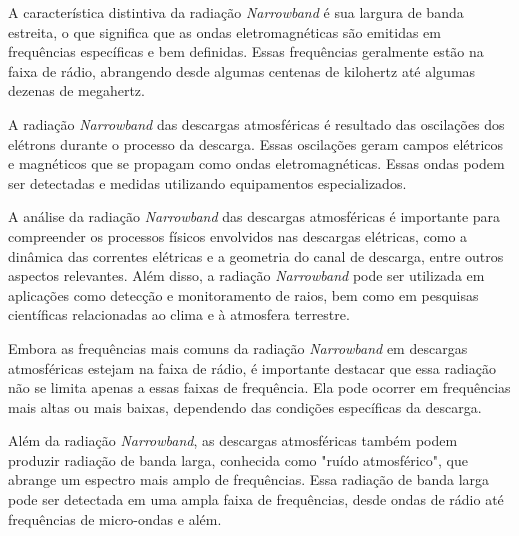 \documentclass[a4paper, 12pt, onecolumn,singlespacing]{article}
\begin{document}
		A característica distintiva da radiação \textit{Narrowband} é sua largura de banda estreita, o que significa que as ondas eletromagnéticas são emitidas em frequências específicas e bem definidas. Essas frequências geralmente estão na faixa de rádio, abrangendo desde algumas centenas de kilohertz até algumas dezenas de megahertz.
		
		A radiação \textit{Narrowband} das descargas atmosféricas é resultado das oscilações dos elétrons durante o processo da descarga. Essas oscilações geram campos elétricos e magnéticos que se propagam como ondas eletromagnéticas. Essas ondas podem ser detectadas e medidas utilizando equipamentos especializados.
		
		A análise da radiação \textit{Narrowband} das descargas atmosféricas é importante para compreender os processos físicos envolvidos nas descargas elétricas, como a dinâmica das correntes elétricas e a geometria do canal de descarga, entre outros aspectos relevantes. Além disso, a radiação \textit{Narrowband} pode ser utilizada em aplicações como detecção e monitoramento de raios, bem como em pesquisas científicas relacionadas ao clima e à atmosfera terrestre.
		
		Embora as frequências mais comuns da radiação \textit{Narrowband} em descargas atmosféricas estejam na faixa de rádio, é importante destacar que essa radiação não se limita apenas a essas faixas de frequência. Ela pode ocorrer em frequências mais altas ou mais baixas, dependendo das condições específicas da descarga.
		
		Além da radiação \textit{Narrowband}, as descargas atmosféricas também podem produzir radiação de banda larga, conhecida como "ruído atmosférico", que abrange um espectro mais amplo de frequências. Essa radiação de banda larga pode ser detectada em uma ampla faixa de frequências, desde ondas de rádio até frequências de micro-ondas e além.
		
\end{document}
